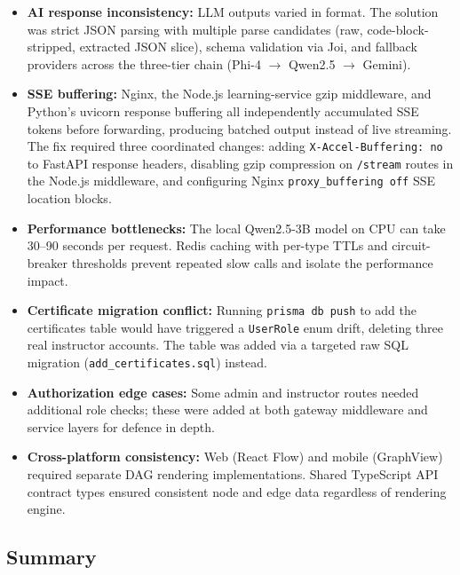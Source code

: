 \begin{itemize}
    \item \textbf{AI response inconsistency:} LLM outputs varied in format. The solution was strict JSON parsing with multiple parse candidates (raw, code-block-stripped, extracted JSON slice), schema validation via Joi, and fallback providers across the three-tier chain (Phi-4 $\rightarrow$ Qwen2.5 $\rightarrow$ Gemini).
    \item \textbf{SSE buffering:} Nginx, the Node.js learning-service gzip middleware, and Python's uvicorn response buffering all independently accumulated SSE tokens before forwarding, producing batched output instead of live streaming. The fix required three coordinated changes: adding \texttt{X-Accel-Buffering: no} to FastAPI response headers, disabling gzip compression on \texttt{/stream} routes in the Node.js middleware, and configuring Nginx \texttt{proxy\_buffering off} SSE location blocks.
    \item \textbf{Performance bottlenecks:} The local Qwen2.5-3B model on CPU can take 30--90 seconds per request. Redis caching with per-type TTLs and circuit-breaker thresholds prevent repeated slow calls and isolate the performance impact.
    \item \textbf{Certificate migration conflict:} Running \texttt{prisma db push} to add the certificates table would have triggered a \texttt{UserRole} enum drift, deleting three real instructor accounts. The table was added via a targeted raw SQL migration (\texttt{add\_certificates.sql}) instead.
    \item \textbf{Authorization edge cases:} Some admin and instructor routes needed additional role checks; these were added at both gateway middleware and service layers for defence in depth.
    \item \textbf{Cross-platform consistency:} Web (React Flow) and mobile (GraphView) required separate DAG rendering implementations. Shared TypeScript API contract types ensured consistent node and edge data regardless of rendering engine.
\end{itemize}

\subsection{Summary}

